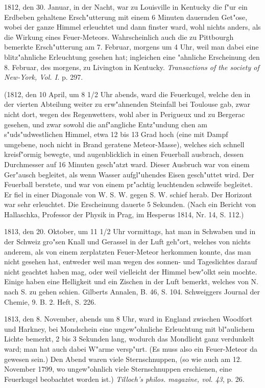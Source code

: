 \documentclass[a4paper, 11pt, oneside, polutonikogreek, german]{article}
\begin{document}
1812, den 30. Januar, in der Nacht, war zu Louisville in Kentucky die f"ur ein Erdbeben gehaltene Ersch"utterung mit einem 6 Minuten dauernden Get"ose, wobei der ganze Himmel erleuchtet und dann finster ward, wohl nichts anders, als die Wirkung eines Feuer-Meteors. Wahrscheinlich auch die zu Pittbourgh bemerkte Ersch"utterung am 7. Februar, morgens um 4 Uhr, weil man dabei eine blitz"ahnliche Erleuchtung gesehen hat; ingleichen eine "ahnliche Erscheinung den 8. Februar, des morgens, zu Livington in Kentucky. \emph{Transactions of the society of New-York, Vol. I.} p. 297.

(1812, den 10 April, um 8 1/2 Uhr abends, ward die Feuerkugel, welche den in der vierten Abteilung weiter zu erw"ahnenden Steinfall bei Toulouse gab, zwar nicht dort, wegen des Regenwetters, wohl aber in Perigueux und zu Bergerac gesehen, und zwar sowohl die anf"angliche Entz"undung chen am s"uds"udwestlichen Himmel, etwa 12 bis 13 Grad hoch (eine mit Dampf umgebene, noch nicht in Brand geratene Meteor-Masse), welches sich schnell kreisf"ormig bewegte, und augenblicklich in einen Feuerball ausbrach, dessen Durchmesser auf 16 Minuten gesch"atzt ward. Dieser Ausbruch war von einem Ger"ausch begleitet, als wenn Wasser aufgl"uhendes Eisen gesch"uttet wird. Der Feuerball berstete, und war von einem pr"achtig leuchtenden schweife begleitet. Er fiel in einer Diagonale von W. S. W. gegen S. W. schief herab. Der Horizont war sehr erleuchtet. Die Erscheinung dauerte 5 Sekunden. (Nach ein Bericht von Hallaschka, Professor der Physik in Prag, im Hesperus 1814, Nr. 14, S. 112.)

1813, den 20. Oktober, um 11 1/2 Uhr vormittags, hat man in Schwaben und in der Schweiz gro"sen Knall und Gerassel in der Luft geh"ort, welches von nichts anderem, als von einem zerplatzten Feuer-Meteor herkommen konnte, das man nicht gesehen hat, entweder weil man wegen des sonnen- und Tageslichtes darauf nicht geachtet haben mag, oder weil vielleicht der Himmel bew"olkt sein mochte. Einige haben eine Helligkeit und ein Zischen in der Luft bemerkt, welches von N. nach S. zu gehen schien. Gilberts Annalen, B. 46, S. 104. Schweiggers Journal der Chemie, 9. B. 2. Heft, S. 226.

1813, den 8. November, abends um 8 Uhr, ward in England zwischen Woodfort und Harkney, bei Mondschein eine ungew"ohnliche Erleuchtung mit bl"aulichem Lichte bemerkt, 2 bis 3 Sekunden lang, wodurch das Mondlicht ganz verdunkelt ward; man hat auch dabei W"arme versp"urt. (Es muss also ein Feuer-Meteor da gewesen sein.) Den Abend waren viele Sternschnuppen, (so wie auch am 12. November 1799, wo ungew"ohnlich viele Sternschnuppen erschienen, eine Feuerkugel beobachtet worden ist.) \emph{Tilloch's philos. magazine, vol. 43}, p. 26.
\end{document}
